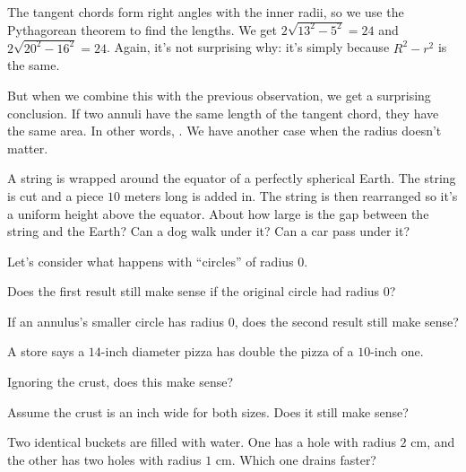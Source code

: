 \documentclass[11pt,paper=letter]{scrartcl}
\newcommand{\faBolt}{\emoji{high-voltage}}
\begin{document}
The tangent chords form right angles with the inner radii, so we use the Pythagorean theorem to find the lengths. We get $2\sqrt{13^2 - 5^2} = 24$ and $2\sqrt{20^2 - 16^2} = 24$. Again, it's not surprising why: it's simply because $R^2 - r^2$ is the same.

But when we combine this with the previous observation, we get a surprising conclusion. If two annuli have the same length of the tangent chord, they have the same area. In other words, . We have another case when the radius doesn't matter.

\begin{mdframed}[style=exmdbox]
  \begin{exercise}
    A string is wrapped around the equator of a perfectly spherical Earth. The string is cut and a piece $10$ meters long is added in. The string is then rearranged so it's a uniform height above the equator. About how large is the gap between the string and the Earth? Can a dog walk under it? Can a car pass under it?
  \end{exercise}

  \begin{exercise}
    Let's consider what happens with ``circles'' of radius $0$.
    \begin{enumthin}
      \item[(a)] Does the first result still make sense if the original circle had radius $0$?
      \item[(b)] If an annulus's smaller circle has radius $0$, does the second result still make sense?
    \end{enumthin}
  \end{exercise}

  \begin{problem}
    A store says a $14$-inch diameter pizza has double the pizza of a $10$-inch one.
    \begin{enumthin}
      \item[(a)] Ignoring the crust, does this make sense?
      \item[(b)] Assume the crust is an inch wide for both sizes. Does it still make sense? \hint{\ref{h:an31}}
    \end{enumthin}
  \end{problem}

  \begin{problem}[\faBolt]
    Two identical buckets are filled with water. One has a hole with radius $2 \text{ cm}$, and the other has two holes with radius $1 \text{ cm}$. Which one drains faster? \hints{\ref{h:an41} \ref{h:an42}} %
  \end{problem}
\end{mdframed}
\end{document}
